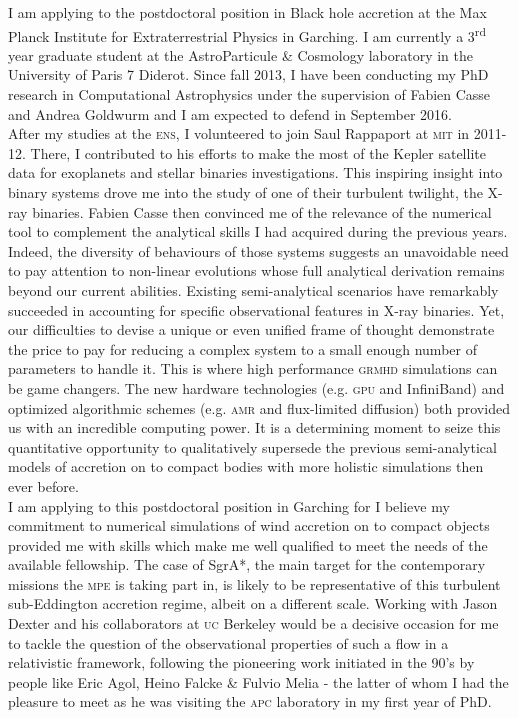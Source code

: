 \documentclass[12pt]{letter}
\begin{document}
\begin{letter} {}
\hspace*{0.5cm} I am applying to the postdoctoral position in Black hole accretion at the Max Planck Institute for Extraterrestrial Physics in Garching. I am currently a 3\textsuperscript{rd} year graduate student at the AstroParticule \& Cosmology laboratory in the University of Paris 7 Diderot. Since fall 2013, I have been conducting my PhD research in Computational Astrophysics under the supervision of Fabien Casse and Andrea Goldwurm and I am expected to defend in September 2016.\\
\hspace*{0.5cm} After my studies at the \textsc{ens}, I volunteered to join Saul Rappaport at \textsc{mit} in 2011-12. There, I contributed to his efforts to make the most of the Kepler satellite data for exoplanets and stellar binaries investigations. This inspiring insight into binary systems drove me into the study of one of their turbulent twilight, the X-ray binaries. Fabien Casse then convinced me of the relevance of the numerical tool to complement the analytical skills I had acquired during the previous years. Indeed, the diversity of behaviours of those systems suggests an unavoidable need to pay attention to non-linear evolutions whose full analytical derivation remains beyond our current abilities. Existing semi-analytical scenarios have remarkably succeeded in accounting for specific observational features in X-ray binaries. Yet, our difficulties to devise a unique or even unified frame of thought demonstrate the price to pay for reducing a complex system to a small enough number of parameters to handle it. This is where high performance \textsc{grmhd} simulations can be game changers. The new hardware technologies (e.g. \textsc{gpu} and InfiniBand) and optimized algorithmic schemes (e.g. \textsc{amr} and flux-limited diffusion) both provided us with an incredible computing power. It is a determining moment to seize this quantitative opportunity to qualitatively supersede the previous semi-analytical models of accretion on to compact bodies with more holistic simulations then ever before.\\
\hspace*{0.5cm} I am applying to this postdoctoral position in Garching for I believe my commitment to numerical simulations of wind accretion on to compact objects provided me with skills which make me well qualified to meet the needs of the available fellowship. The case of SgrA*, the main target for the contemporary missions the \textsc{mpe} is taking part in, is likely to be representative of this turbulent sub-Eddington accretion regime, albeit on a different scale. Working with Jason Dexter and his collaborators at \textsc{uc} Berkeley would be a decisive occasion for me to tackle the question of the observational properties of such a flow in a relativistic framework, following the pioneering work initiated in the 90's by people like Eric Agol, Heino Falcke \& Fulvio Melia - the latter of whom I had the pleasure to meet as he was visiting the \textsc{apc} laboratory in my first year of PhD.\\

\end{letter}
\end{document}
